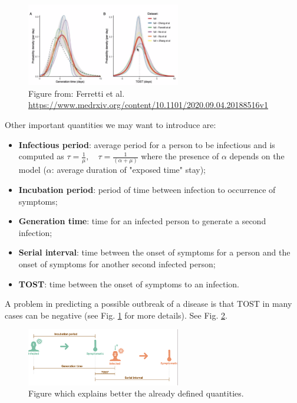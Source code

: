 \documentclass[../main/main.tex]{subfiles}
\begin{document}
\begin{figure}[h!]
\centering
\includegraphics[width=0.6\textwidth]{../lessons/image/02/4_TOST.png}
\caption{\label{fig:4_TOST} Figure from: Ferretti et al. \url{https://www.medrxiv.org/content/10.1101/2020.09.04.20188516v1}}
\end{figure}



Other important quantities we may want to introduce are:

\begin{itemize}
    \item \textbf{Infectious period}: average period for a person to be infectious and is computed as $ \tau = \frac{1}{\mu }, \quad \tau = \frac{1}{(\alpha + \mu )} $ where the presence of $\alpha$ depends on the model ($\alpha$: average duration of "exposed time" stay);
    \item \textbf{Incubation period}: period of time between infection to occurrence of symptoms;
    \item \textbf{Generation time}: time for an infected person to generate a second infection;
    \item \textbf{Serial interval}: time between the onset of symptoms for a person and the onset of symptoms for another second infected person;
    \item \textbf{TOST}: time between the onset of symptoms to an infection.
    
\end{itemize}
A problem in predicting a possible outbreak of a disease is that TOST in many cases can be negative (see Fig. \ref{fig:4_TOST} for more details). See Fig. \ref{fig:4_11}.

\begin{figure}[h!]
\centering
\includegraphics[width=0.6\textwidth]{../lessons/image/02/4_11.png}
\caption{\label{fig:4_11} Figure which explains better the already defined quantities.}
\end{figure}
\end{document}
